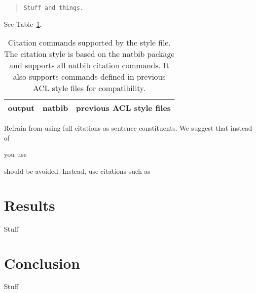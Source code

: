 \documentclass[11pt,a4paper]{article}
\begin{document}
\begin{quote}
\begin{verbatim}
Stuff and things.
\end{verbatim}
\end{quote}

See Table~\ref{cit-table}.

\begin{table}
\centering
\begin{tabular}{lll}
  output & natbib & previous ACL style files\\
  \hline
\end{tabular}
\caption{\label{cit-table}Citation commands supported by the style file. The citation style is based on the natbib package and supports all natbib citation commands. It also supports commands defined in previous ACL style files for compatibility.}
\end{table}


Refrain from using full citations as sentence constituents. We suggest that instead of
\begin{quote}
\end{quote}
you use
\begin{quote}
\end{quote}




\begin{quote}
\end{quote}
should be avoided. Instead, use citations such as 
\begin{quote}
\end{quote}

\section{Results}
\label{sec:results}

Stuff

\section{Conclusion}
\label{sec:conc}

Stuff

\end{document}
